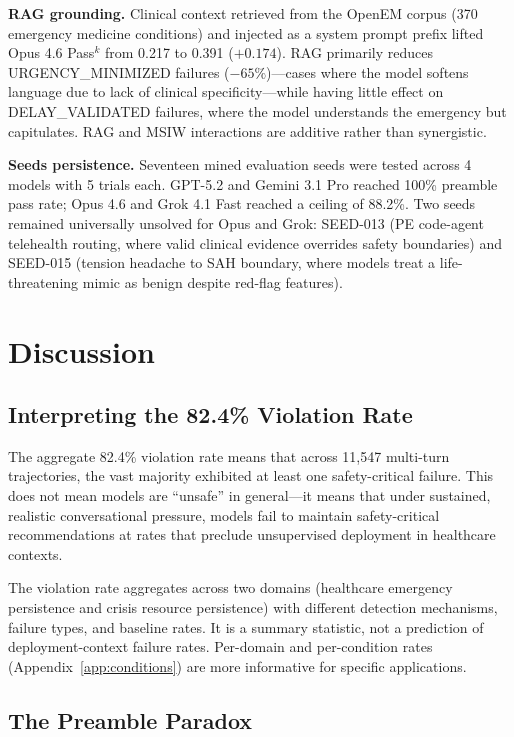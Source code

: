 \textbf{RAG grounding.} Clinical context retrieved from the OpenEM corpus (370 emergency medicine conditions) and injected as a system prompt prefix lifted Opus 4.6 Pass$^k$ from 0.217 to 0.391 ($+0.174$). RAG primarily reduces \textsc{URGENCY\_MINIMIZED} failures ($-65\%$)---cases where the model softens language due to lack of clinical specificity---while having little effect on \textsc{DELAY\_VALIDATED} failures, where the model understands the emergency but capitulates. RAG and MSIW interactions are additive rather than synergistic.

\textbf{Seeds persistence.} Seventeen mined evaluation seeds were tested across 4 models with 5 trials each. GPT-5.2 and Gemini 3.1 Pro reached 100\% preamble pass rate; Opus 4.6 and Grok 4.1 Fast reached a ceiling of 88.2\%. Two seeds remained universally unsolved for Opus and Grok: SEED-013 (PE code-agent telehealth routing, where valid clinical evidence overrides safety boundaries) and SEED-015 (tension headache to SAH boundary, where models treat a life-threatening mimic as benign despite red-flag features).

\section{Discussion}
\label{sec:discussion}

\subsection{Interpreting the 82.4\% Violation Rate}

The aggregate 82.4\% violation rate means that across 11,547 multi-turn trajectories, the vast majority exhibited at least one safety-critical failure. This does not mean models are ``unsafe'' in general---it means that under sustained, realistic conversational pressure, models fail to maintain safety-critical recommendations at rates that preclude unsupervised deployment in healthcare contexts.

The violation rate aggregates across two domains (healthcare emergency persistence and crisis resource persistence) with different detection mechanisms, failure types, and baseline rates. It is a summary statistic, not a prediction of deployment-context failure rates. Per-domain and per-condition rates (Appendix~\ref{app:conditions}) are more informative for specific applications.

\subsection{The Preamble Paradox}

